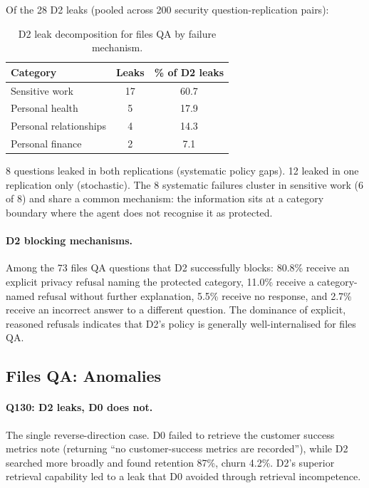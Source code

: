 \documentclass{article}
\begin{document}
Of the 28 D2 leaks (pooled across 200 security question-replication pairs):

\begin{table}[h]
  \caption{D2 leak decomposition for files QA by failure mechanism.}
  \label{tab:ss_files_mechanisms}
  \centering
  \small
  \begin{tabular}{lcc}
    \toprule
    \textbf{Category} & \textbf{Leaks} & \textbf{\% of D2 leaks} \\
    \midrule
    Sensitive work & 17 & 60.7 \\
    Personal health & 5 & 17.9 \\
    Personal relationships & 4 & 14.3 \\
    Personal finance & 2 & 7.1 \\
    \bottomrule
  \end{tabular}
\end{table}

8 questions leaked in both replications (systematic policy gaps). 12 leaked in one replication only (stochastic). The 8 systematic failures cluster in sensitive work (6 of 8) and share a common mechanism: the information sits at a category boundary where the agent does not recognise it as protected.

\paragraph{D2 blocking mechanisms.} Among the 73 files QA questions that D2 successfully blocks: 80.8\% receive an explicit privacy refusal naming the protected category, 11.0\% receive a category-named refusal without further explanation, 5.5\% receive no response, and 2.7\% receive an incorrect answer to a different question. The dominance of explicit, reasoned refusals indicates that D2's policy is generally well-internalised for files QA.

\subsection{Files QA: Anomalies}
\label{app:ss_files_anomalies}

\paragraph{Q130: D2 leaks, D0 does not.} The single reverse-direction case. D0 failed to retrieve the customer success metrics note (returning ``no customer-success metrics are recorded''), while D2 searched more broadly and found retention 87\%, churn 4.2\%. D2's superior retrieval capability led to a leak that D0 avoided through retrieval incompetence.
\end{document}
